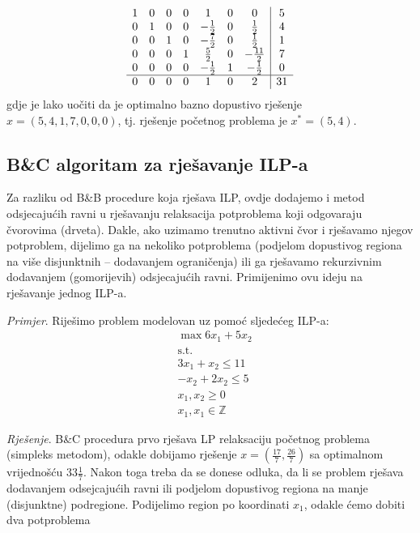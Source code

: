 \documentclass[a4paper, utf8, 11pt, colorlinks]{article}
\begin{document}
$$ \begin{array}{ccccccc| c}
    1    &   0   &   0   &  0 &  1  &   0    &    0    & 5  \\
0    &   1   &   0   &  0   &   -\frac{1}{2}    &   0   & \frac{1}{2} & 4 \\
0    &   0   &   1   &  0   &   -\frac{7}{2}    &   0   & \frac{1}{2} & 1 \\
0    &   0   &   0   &  1  &   \frac{5}{2}    &  0 &  -\frac{11}{2}    & 7 \\ 
0    &   0   &   0   &   0 &  -\frac{1}{2}    &   1   & - \frac{1}{2} & 0\\ \hline
0    &   0   &   0   &  0  &   1    &    0   & 2 & 31  
\end{array} 
$$
gdje je lako uočiti da je optimalno bazno dopustivo rješenje $x=(5, 4, 1, 7, 0, 0, 0 )$, tj. rješenje početnog problema je $x^*=(5, 4)$.

\subsection{B\&C algoritam za rješavanje ILP-a}
Za razliku od B\&B procedure koja rješava ILP, ovdje dodajemo i metod odsjecajućih ravni u rješavanju relaksacija potproblema koji odgovaraju čvorovima (drveta). Dakle, ako  uzimamo trenutno aktivni čvor i rješavamo njegov potproblem, dijelimo ga na nekoliko potproblema (podjelom dopustivog regiona na više disjunktnih -- dodavanjem ograničenja) ili ga rješavamo rekurzivnim dodavanjem (gomorijevih) odsjecajućih ravni. Primijenimo ovu ideju na rješavanje jednog ILP-a.

\emph{Primjer}.  Riješimo problem modelovan uz pomoć sljedećeg ILP-a:
\begin{align*}
    &\max 6 x_1 + 5 x_2 \\
    & \mbox{s.t. } \\
    & 3x_1 + x_2 \leq 11 \\
    & - x_2 + 2 x_2 \leq 5 \\
    & x_1, x_2 \geq 0 \\
    & x_1, x_1 \in \mathbb{Z}
\end{align*}

\emph{Rješenje}. B\&C procedura prvo rješava LP relaksaciju početnog problema (simpleks metodom), odakle dobijamo rješenje $x=(\frac{17}{7}, \frac{26}{7})$
sa optimalnom vrijednošću $33\frac{1}{7}$. Nakon toga treba da se donese odluka, da li se problem rješava dodavanjem odsejcajućih ravni ili podjelom dopustivog regiona na manje (disjunktne) podregione. Podijelimo region po koordinati $x_1$, odakle ćemo dobiti dva potproblema 
\end{document}

